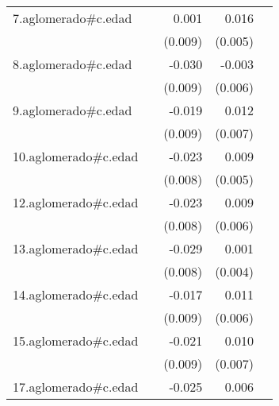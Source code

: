 {\begin{longtable}{l*{4}{D{.}{.}{-1}}}
\addlinespace
7.aglomerado#c.edad&                     &       0.001         &       0.016\sym{**} &                     \\
            &                     &     (0.009)         &     (0.005)         &                     \\
\addlinespace
8.aglomerado#c.edad&                     &      -0.030\sym{***}&      -0.003         &                     \\
            &                     &     (0.009)         &     (0.006)         &                     \\
\addlinespace
9.aglomerado#c.edad&                     &      -0.019\sym{*}  &       0.012         &                     \\
            &                     &     (0.009)         &     (0.007)         &                     \\
\addlinespace
10.aglomerado#c.edad&                     &      -0.023\sym{**} &       0.009         &                     \\
            &                     &     (0.008)         &     (0.005)         &                     \\
\addlinespace
12.aglomerado#c.edad&                     &      -0.023\sym{**} &       0.009         &                     \\
            &                     &     (0.008)         &     (0.006)         &                     \\
\addlinespace
13.aglomerado#c.edad&                     &      -0.029\sym{***}&       0.001         &                     \\
            &                     &     (0.008)         &     (0.004)         &                     \\
\addlinespace
14.aglomerado#c.edad&                     &      -0.017         &       0.011         &                     \\
            &                     &     (0.009)         &     (0.006)         &                     \\
\addlinespace
15.aglomerado#c.edad&                     &      -0.021\sym{*}  &       0.010         &                     \\
            &                     &     (0.009)         &     (0.007)         &                     \\
\addlinespace
17.aglomerado#c.edad&                     &      -0.025\sym{*}  &       0.006         &                     \\

\end{longtable}}
